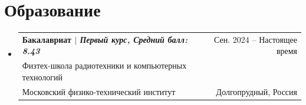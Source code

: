 \documentclass[A4,11pt]{article}
\makeatletter
\newcommand{\CVSubheading}[4]{
  \vspace{-2pt}\item
    \begin{tabular*}{0.97\textwidth}[t]{l@{\extracolsep{\fill}}r}
      \textbf{#1} & #2 \\
      \small#3 & \small #4 \\
    \end{tabular*}\vspace{-7pt}
}
\newcommand{\CVSubHeadingListStart}{\begin{itemize}[leftmargin=0.5cm, label={}]}
\newcommand{\CVSubHeadingListEnd}{\end{itemize}}
\makeatother
\begin{document}

\section{Образование}
  \CVSubHeadingListStart
    \CVSubheading
      {{Бакалавриат $|$ \emph{\small{Первый курс, Средний балл: 8.43}}}}{Сен. 2024 -- Настоящее время}
      {Физтех-школа радиотехники и компьютерных технологий \\ Московский физико-технический институт}{Долгопрудный, Россия}
  \CVSubHeadingListEnd

\end{document}
